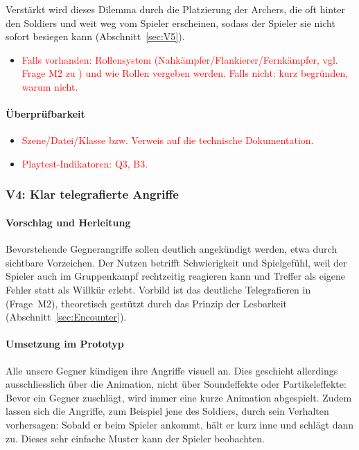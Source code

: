 \documentclass[../Main.tex]{subfiles}
\begin{document}
Verstärkt wird dieses Dilemma durch die Platzierung der Archers, die oft hinter den Soldiers und weit weg vom Spieler erscheinen, sodass der Spieler sie nicht sofort besiegen kann (Abschnitt~\ref{sec:V5}).

\begin{itemize}[leftmargin=1.5cm]
    \item \textcolor{red}{Falls vorhanden: Rollensystem (Nahkämpfer/Flankierer/Fernkämpfer, vgl. Frage M2 zu ) und wie Rollen vergeben werden. Falls nicht: kurz begründen, warum nicht.}
\end{itemize}

\paragraph{Überprüfbarkeit}
\begin{itemize}[leftmargin=1.5cm]
    \item \textcolor{red}{Szene/Datei/Klasse bzw. Verweis auf die technische Dokumentation.}
    \item \textcolor{red}{Playtest-Indikatoren: Q3, B3.}
\end{itemize}

\subsubsection{V4: Klar telegrafierte Angriffe} \label{sec:V4}

\paragraph{Vorschlag und Herleitung}
Bevorstehende Gegnerangriffe sollen deutlich angekündigt werden, etwa durch sichtbare Vorzeichen. Der Nutzen betrifft Schwierigkeit und Spielgefühl, weil der Spieler auch im Gruppenkampf rechtzeitig reagieren kann und Treffer als eigene Fehler statt als Willkür erlebt. Vorbild ist das deutliche Telegrafieren in  (Frage~M2), theoretisch gestützt durch das Prinzip der Lesbarkeit (Abschnitt~\ref{sec:Encounter}).

\paragraph{Umsetzung im Prototyp}
Alle unsere Gegner kündigen ihre Angriffe visuell an. Dies geschieht allerdings ausschliesslich über die Animation, nicht über Soundeffekte oder Partikeleffekte: Bevor ein Gegner zuschlägt, wird immer eine kurze Animation abgespielt. Zudem lassen sich die Angriffe, zum Beispiel jene des Soldiers, durch sein Verhalten vorhersagen: Sobald er beim Spieler ankommt, hält er kurz inne und schlägt dann zu. Dieses sehr einfache Muster kann der Spieler beobachten.
\end{document}
